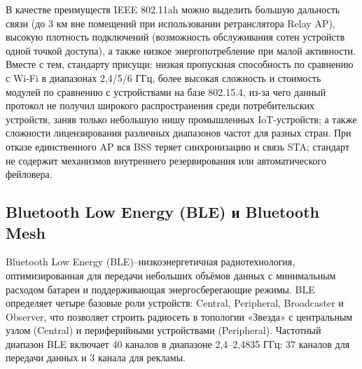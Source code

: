 \documentclass[14pt, a4paper]{extreport}
\begin{document}
В качестве преимуществ IEEE 802.11ah можно выделить большую дальность связи (до 3 км вне помещений при использовании ретранслятора Relay AP), высокую плотность подключений
(возможность обслуживания сотен устройств одной точкой доступа), а также низкое энергопотребление при малой активности. Вместе с тем, стандарту присущи: низкая пропускная способность
по сравнению с Wi-Fi в диапазонах 2,4/5/6 ГГц, более высокая сложность и стоимость модулей по сравнению с устройствами на базе 802.15.4, из-за чего данный протокол не получил широкого
распространения среди потребительских устройств, заняв только небольшую нишу промышленных IoT-устройств; а также сложности лицензирования различных диапазонов частот для разных стран.
При отказе единственного AP вся BSS теряет синхронизацию и связь STA; стандарт не содержит механизмов внутреннего резервирования или автоматического фейловера.


\subsection{Bluetooth Low Energy (BLE) и Bluetooth Mesh}

Bluetooth Low Energy (BLE)--низкоэнергетичная радиотехнология, оптимизированная для передачи небольших объёмов данных с минимальным расходом батареи и поддерживающая энергосберегающие
режимы. BLE определяет четыре базовые роли устройств: Central, Peripheral, Broadcaster и Observer, что позволяет строить радиосеть в топологии «Звезда» с центральным узлом (Central) и периферийными устройствами (Peripheral).
Частотный диапазон BLE включает 40 каналов в диапазоне 2,4–2,4835 ГГц: 37 каналов для передачи данных и 3 канала для рекламы.
\end{document}
